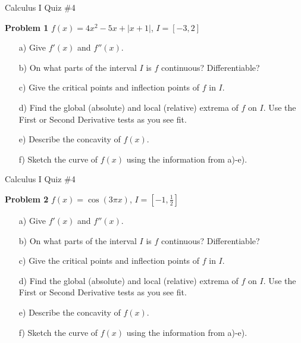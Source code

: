 \documentclass[10pt]{article}
\begin{document}


\begin{center}
Calculus I Quiz \#4
\end{center}



\noindent\textbf{Problem 1} $f(x) = 4x^2 - 5x + |x+1|$, $I = [-3,2]$
\begin{itemize}
\item[a) ] Give $f'(x)$ and $f''(x)$. 
\item[b) ] On what parts of the interval $I$ is $f$ continuous? Differentiable?
\item[c) ] Give the critical points and inflection points of $f$ in $I$.
\item[d) ] Find the global (absolute) and local (relative) extrema of $f$ on $I$. Use the First or Second Derivative tests as you see fit.
\item[e) ] Describe the concavity of $f(x)$. 
\item[f) ] Sketch the curve of $f(x)$ using the information from a)-e).
\end{itemize}


\pagebreak

\begin{center}
Calculus I Quiz \#4
\end{center}



\noindent\textbf{Problem 2} $f(x) = \cos(3\pi x)$, $I = [-1,\frac{1}{2}]$
\begin{itemize}
\item[a) ] Give $f'(x)$ and $f''(x)$. 
\item[b) ] On what parts of the interval $I$ is $f$ continuous? Differentiable?
\item[c) ] Give the critical points and inflection points of $f$ in $I$.
\item[d) ] Find the global (absolute) and local (relative) extrema of $f$ on $I$. Use the First or Second Derivative tests as you see fit.
\item[e) ] Describe the concavity of $f(x)$. 
\item[f) ] Sketch the curve of $f(x)$ using the information from a)-e).
\end{itemize}
\end{document}
